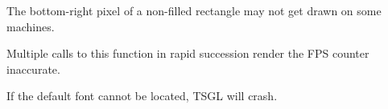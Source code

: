 
\begin{DoxyRefList}
\item[\label{bug__bug000001}%
\hypertarget{bug__bug000001}{}%
Member \hyperlink{classtsgl_1_1_canvas_a752754cd16d14447cb5e5b0438bebf16}{tsgl\+:\+:Canvas\+:\+:draw\+Rectangle} (int x1, int y1, int x2, int y2, \hyperlink{structtsgl_1_1_color_float}{Color\+Float} color=B\+L\+A\+C\+K, bool filled=true)]The bottom-\/right pixel of a non-\/filled rectangle may not get drawn on some machines.  
\item[\label{bug__bug000002}%
\hypertarget{bug__bug000002}{}%
Member \hyperlink{classtsgl_1_1_canvas_ac035f43763b198f6915a0772973a5ea9}{tsgl\+:\+:Canvas\+:\+:take\+Screen\+Shot} ()]Multiple calls to this function in rapid succession render the F\+P\+S counter inaccurate.  
\item[\label{bug__bug000003}%
\hypertarget{bug__bug000003}{}%
Member \hyperlink{classtsgl_1_1_texture_handler_a7f3103ea7f43f5a042609b443a748c88}{tsgl\+:\+:Texture\+Handler\+:\+:draw\+Text} (std\+::wstring text, unsigned int font\+\_\+size, float $\ast$vertices)]If the default font cannot be located, T\+S\+G\+L will crash. 
\end{DoxyRefList}